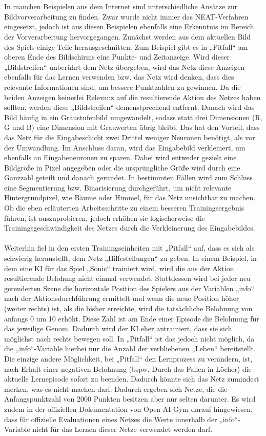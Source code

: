 \\
\\
In manchen Beispielen aus dem Internet sind unterschiedliche Ansätze zur Bildvorverarbeitung zu finden. Zwar wurde nicht immer das NEAT-Verfahren eingesetzt, jedoch ist aus diesen Beispielen ebenfalls eine Erkenntnis im Bereich der Vorverarbeitung hervorgegangen. Zunächst werden aus dem aktuellen Bild des Spiels einige Teile herausgeschnitten. Zum Beispiel gibt es in „Pitfall“ am oberen Ende des Bildschirms eine Punkte- und Zeitanzeige. Wird dieser „Bildstreifen“ unberührt dem Netz übergeben, wird das Netz diese Anzeigen ebenfalls für das Lernen verwenden bzw. das Netz wird denken, dass dies relevante Informationen sind, um bessere Punktzahlen zu gewinnen. Da die beiden Anzeigen keinerlei Relevanz auf die resultierende Aktion des Netzes haben sollten, werden diese „Bildstreifen“ demenstprechend entfernt. Danach wird das Bild häufig in ein Graustufenbild umgewandelt, sodass statt drei Dimensionen (R, G und B) eine Dimension mit Grauwerten übrig bleibt. Das hat den Vorteil, dass das Netz für die Eingabeschicht zwei Drittel weniger Neuronen benötigt, als vor der Umwandlung. Im Anschluss daran, wird das Eingabebild verkleinert, um ebenfalls an Eingabeneuronen zu sparen. Dabei wird entweder gezielt eine Bildgröße in Pixel angegeben oder die ursprüngliche Größe wird durch eine Ganzzahl geteilt und danach gerundet. In bestimmten Fällen wird zum Schluss eine Segmentierung bzw. Binarisierung durchgeführt, um nicht relevante Hintergrundpixel, wie Bäume oder Himmel, für das Netz unsichtbar zu machen. Ob die eben erläuterten Arbeitsschritte zu einem besseren Trainingsergebnis führen, ist auszuprobieren, jedoch erhöhen sie logischerweise die Trainingsgeschwindigkeit des Netzes durch die Verkleinerung des Eingabebildes.
\\
\\
Weiterhin fiel in den ersten Trainingseinheiten mit „Pitfall“ auf, dass es sich als schwierig heraustellt, dem Netz „Hilfestellungen“ zu geben. In einem Beispiel, in dem eine KI für das Spiel „Sonic“ trainiert wird, wird die aus der Aktion resultierende Belohung nicht einmal verwendet. Stattdessen wird bei jeder neu gerenderten Szene die horizontale Position des Spielers aus der Variablen „info“ nach der Aktionsdurchführung ermittelt und wenn die neue Position höher (weiter rechts) ist, als die bisher erreichte, wird die tatsächliche Belohnung von anfangs 0 um 10 erhöht. Diese Zahl ist am Ende einer Episode die Belohnung für das jeweilige Genom. Dadurch wird der KI eher antrainiert, dass sie sich möglichst nach rechts bewegen soll. In „Pitfall“ ist das jedoch nicht möglich, da die „info“-Variable hierbei nur die Anzahl der verbliebenen „Leben“ bereitstellt. Die einzige andere Möglichkeit, bei „Pitfall“ den Lernprozess zu verändern, ist, nach Erhalt einer negativen Belohnung (bspw. Durch das Fallen in Löcher) die aktuelle Lernepisode sofort zu beenden. Dadurch könnte sich das Netz zumindest merken, was es nicht machen darf. Dadurch ergeben sich Netze, die die Anfangspunktzahl von 2000 Punkten besitzen aber nur selten darunter. Es wird zudem in der offiziellen Dokumentation von Open AI Gym darauf hingewiesen, dass für offizielle Evaluationen eines Netzes die Werte innerhalb der „info“-Variable nicht für das Lernen dieser Netze verwendet werden darf.
